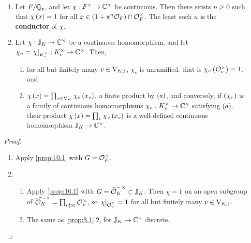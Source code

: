 \begin{corollary}
\label{cor:10.2}
\hfill
\begin{enumerate}
\item Let $ F / \mathbb{Q}_p $, and let $ \chi : F^\times \to \mathbb{C}^\times $ be continuous. Then there exists $ n \ge 0 $ such that $ \chi\br{x} = 1 $ for all $ x \in \br{1 + \pi^n\OOO_F} \cap \OOO_F^\times $. The least such $ n $ is the \textbf{conductor} of $ \chi $.
\item Let $ \chi : \mathbb{J}_K \to \mathbb{C}^\times $ be a continuous homomorphism, and let $ \chi_v = \left. \chi \right|_{K_v^\times} : K_v^\times \to \mathbb{C}^\times $. Then,
\begin{enumerate}
\item for all but finitely many $ v \in \mathrm{V}_{K, \mathrm{f}} $, $ \chi_v $ is unramified, that is $ \chi_v\br{\OOO_v^\times} = 1 $, and
\item $ \chi\br{x} = \prod_{v \in \V_K} \chi_v\br{x_v} $, a finite product by $ \br{a} $, and conversely, if $ \br{\chi_v} $ is a family of continuous homomorphisms $ \chi_v : K_v^\times \to \mathbb{C}^\times $ satisfying $ \br{a} $, their product $ \chi\br{x} = \prod_v \chi_v\br{x_v} $ is a well-defined continuous homomorphism $ \mathbb{J}_K \to \mathbb{C}^\times $.
\end{enumerate}
\end{enumerate}
\end{corollary}

\pagebreak

\begin{proof}
\hfill
\begin{enumerate}
\item Apply \ref{prop:10.1} with $ G = \mathcal{O}_F^\times $.
\item \hfill
\begin{enumerate}
\item Apply \ref{prop:10.1} with $ G = \widehat{\mathcal{O}_K}^\times \subset \mathbb{J}_K $. Then $ \chi = 1 $ on an open subgroup of $ \widehat{\mathcal{O}_K}^\times = \prod_{v \nmid \infty} \mathcal{O}_v^\times $, so $ \left. \chi \right|_{\mathcal{O}_v^\times} = 1 $ for all but finitely many $ v \in \mathrm{V}_{K, \mathrm{f}} $.
\item The same as \ref{prop:8.1}.$ 2 $, for $ \mathbb{J}_K \to \mathbb{C}^\times $ discrete.
\end{enumerate}
\end{enumerate}
\end{proof}

